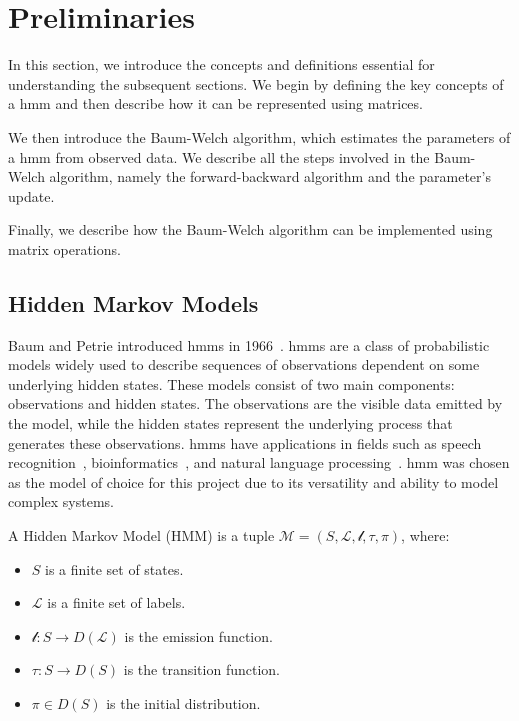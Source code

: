 \section{Preliminaries}\label{sec:preliminaries}
In this section, we introduce the concepts and definitions essential for understanding the subsequent sections.
We begin by defining the key concepts of a \gls{hmm} and then describe how it can be represented using matrices.

We then introduce the Baum-Welch algorithm, which estimates the parameters of a \gls{hmm} from observed data.
We describe all the steps involved in the Baum-Welch algorithm, namely the forward-backward algorithm and the parameter's update.

Finally, we describe how the Baum-Welch algorithm can be implemented using matrix operations.

\subsection{Hidden Markov Models}\label{subsec:hmm}
Baum and Petrie introduced \glspl{hmm} in 1966~\cite{baum1966statistical}.
\glspl{hmm} are a class of probabilistic models widely used to describe sequences of observations dependent on some underlying hidden states.
These models consist of two main components: observations and hidden states.
The observations are the visible data emitted by the model, while the hidden states represent the underlying process that generates these observations.
\glspl{hmm} have applications in fields such as speech recognition~\cite{chavan2013overview}, bioinformatics~\cite{de2007hidden}, and natural language processing~\cite{murveit1990integrating}.
\gls{hmm} was chosen as the model of choice for this project due to its versatility and ability to model complex systems.

\begin{definition}
    A Hidden Markov Model (HMM) is a tuple $\mathcal{M} = (S, \mathcal{L}, \mathscr{l}, \tau,  \pi)$, where:
    \begin{itemize}
        \item $S$ is a finite set of states.
        \item $\mathcal{L}$ is a finite set of labels.
        \item $\mathscr{l}: S \rightarrow D(\mathcal{L})$ is the emission function.
        \item $\tau: S \rightarrow D(S)$ is the transition function.
        \item $\pi \in D(S)$ is the initial distribution.
    \end{itemize}
\end{definition}

